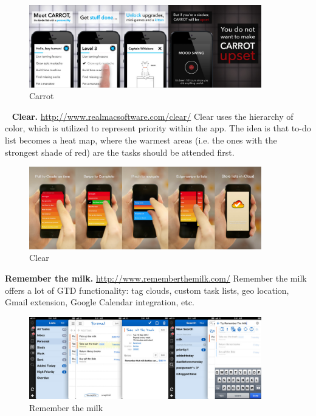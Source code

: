 \begin{figure}
   \centering
	\includegraphics[width=0.9\textwidth]{resources/carrot.pdf}
	\caption[Carrot]{Carrot}
\end{figure}
 
\textbf{Clear.} \url{http://www.realmacsoftware.com/clear/} Clear uses the hierarchy of color, which is utilized to represent priority within the app. The idea is that to-do list becomes a heat map, where the warmest areas (i.e. the ones with the strongest shade of red) are the tasks should be attended first.
 
\begin{figure}
   \centering
	\includegraphics[width=0.9\textwidth]{resources/clear.pdf}
	\caption[Clear]{Clear}
\end{figure}

\textbf{Remember the milk.} \url{http://www.rememberthemilk.com/} Remember the milk offers a lot of GTD functionality: tag clouds, custom task lists, geo location, Gmail extension, Google Calendar integration, etc.

\begin{figure}
   \centering
	\includegraphics[width=0.9\textwidth]{resources/remember-the-milk.pdf}
	\caption[Remember the milk]{Remember the milk}
\end{figure}

